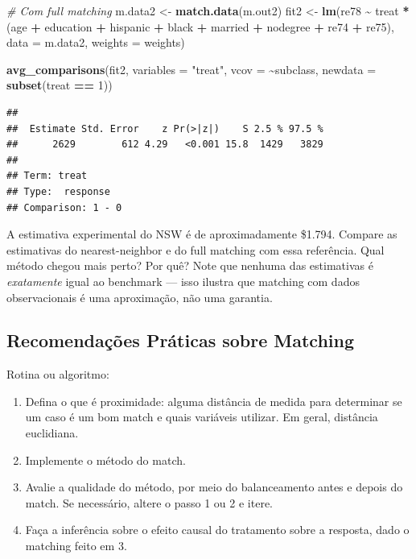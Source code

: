 \documentclass[
]{article}
\newenvironment{Shaded}{\begin{snugshade}}{\end{snugshade}}
\newcommand{\AttributeTok}[1]{\textcolor[rgb]{0.13,0.29,0.53}{#1}}
\newcommand{\CommentTok}[1]{\textcolor[rgb]{0.56,0.35,0.01}{\textit{#1}}}
\newcommand{\DecValTok}[1]{\textcolor[rgb]{0.00,0.00,0.81}{#1}}
\newcommand{\FunctionTok}[1]{\textcolor[rgb]{0.13,0.29,0.53}{\textbf{#1}}}
\newcommand{\NormalTok}[1]{#1}
\newcommand{\OtherTok}[1]{\textcolor[rgb]{0.56,0.35,0.01}{#1}}
\newcommand{\SpecialCharTok}[1]{\textcolor[rgb]{0.81,0.36,0.00}{\textbf{#1}}}
\newcommand{\StringTok}[1]{\textcolor[rgb]{0.31,0.60,0.02}{#1}}
\begin{document}
\begin{Shaded}
\begin{Highlighting}[]
\CommentTok{\# Com full matching}
\NormalTok{m.data2 }\OtherTok{\textless{}{-}} \FunctionTok{match.data}\NormalTok{(m.out2)}
\NormalTok{fit2 }\OtherTok{\textless{}{-}} \FunctionTok{lm}\NormalTok{(re78 }\SpecialCharTok{\textasciitilde{}}\NormalTok{ treat }\SpecialCharTok{*}\NormalTok{ (age }\SpecialCharTok{+}\NormalTok{ education }\SpecialCharTok{+}\NormalTok{ hispanic }\SpecialCharTok{+}\NormalTok{ black }\SpecialCharTok{+}\NormalTok{ married }\SpecialCharTok{+}
\NormalTok{                             nodegree }\SpecialCharTok{+}\NormalTok{ re74 }\SpecialCharTok{+}\NormalTok{ re75),}
           \AttributeTok{data =}\NormalTok{ m.data2, }\AttributeTok{weights =}\NormalTok{ weights)}

\FunctionTok{avg\_comparisons}\NormalTok{(fit2, }\AttributeTok{variables =} \StringTok{"treat"}\NormalTok{,}
                \AttributeTok{vcov =} \SpecialCharTok{\textasciitilde{}}\NormalTok{subclass, }\AttributeTok{newdata =} \FunctionTok{subset}\NormalTok{(treat }\SpecialCharTok{==} \DecValTok{1}\NormalTok{))}
\end{Highlighting}
\end{Shaded}

\begin{verbatim}
## 
##  Estimate Std. Error    z Pr(>|z|)    S 2.5 % 97.5 %
##      2629        612 4.29   <0.001 15.8  1429   3829
## 
## Term: treat
## Type:  response 
## Comparison: 1 - 0
\end{verbatim}

A estimativa experimental do NSW é de aproximadamente \$1.794. Compare as estimativas do nearest-neighbor e do full matching com essa referência. Qual método chegou mais perto? Por quê? Note que nenhuma das estimativas é \emph{exatamente} igual ao benchmark --- isso ilustra que matching com dados observacionais é uma aproximação, não uma garantia.

\subsection{Recomendações Práticas sobre Matching}\label{recomendauxe7uxf5es-pruxe1ticas-sobre-matching}

Rotina ou algoritmo:

\begin{enumerate}
\def\labelenumi{\arabic{enumi}.}
\item
  Defina o que é proximidade: alguma distância de medida para determinar se um caso é um bom match e quais variáveis utilizar. Em geral, distância euclidiana.
\item
  Implemente o método do match.
\item
  Avalie a qualidade do método, por meio do balanceamento antes e depois do match. Se necessário, altere o passo 1 ou 2 e itere.
\item
  Faça a inferência sobre o efeito causal do tratamento sobre a resposta, dado o matching feito em 3.
\end{enumerate}
\end{document}
